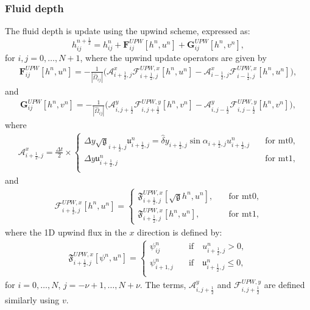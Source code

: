 \subsubsection{Fluid depth}
The fluid depth is update using the upwind scheme, expressed as:
\begin{equation}
	\label{2d-continuity-eq-Cgrid}
	h^{n+\frac{1}{2}}_{ij} =
	h^{n}_{ij} + \mathbf{F}_{ij}^{UPW}[{h^n,{u}^{n}}]  + \mathbf{G}_{ij}^{UPW}[{h^n,{v}^{n}}],
\end{equation}
for $i,j=0,\ldots,N+1$,
where the upwind update operators are given by
\begin{align}
	\mathbf{F}_{ij}^{UPW}[{h^n,u^{n}}] = 
	-\frac{1}{|\hat{\Omega}_{ij}|}
	\bigg(\mathcal{A}_{i+\frac{1}{2},j}^{x} \mathcal{F}_{i+\frac{1}{2},j}^{UPW,x}[h^n,{u}^{n}]-
	      \mathcal{A}_{i-\frac{1}{2},j}^{x} \mathcal{F}_{i-\frac{1}{2},j}^{UPW,x}[h^n,{u}^{n}] \bigg),
\end{align}
and
\begin{align}
	\mathbf{G}_{ij}^{UPW}[{h^n,v^{n}}] = 
	-\frac{1}{|\hat{\Omega}_{ij}|}
	\bigg(\mathcal{A}_{i,j+\frac{1}{2}}^{y} \mathcal{F}_{i,j+\frac{1}{2}}^{UPW,y}[h^n,{v}^{n}]-
          \mathcal{A}_{i,j-\frac{1}{2}}^{y} \mathcal{F}_{i,j-\frac{1}{2}}^{UPW,y}[h^n,{v}^{n}] \bigg),
\end{align}
where
\begin{align}
	\mathcal{A}_{i+\frac{1}{2},j}^{x} = \frac{\Delta t}{2} \times
	\begin{cases}
		\Delta y
		\sqrt{\mathfrak{g}}_{i+\frac{1}{2},j}
		\mathfrak{u}_{i+\frac{1}{2},j}^n=
		\hat{\delta} y_{i+\frac{1}{2},j}
		\sin{\alpha_{i+\frac{1}{2},j}}
		{u}_{i+\frac{1}{2},j}^n
		\quad &
		\text{for mt0},\\
		\Delta y
		\mathfrak{u}_{i+\frac{1}{2},j}^n
		\quad &
		\text{for mt1},\\
	\end{cases}
\end{align}
and
\begin{align}
	\mathcal{F}_{i+\frac{1}{2},j}^{UPW,x} [{h}^n,u^n]= 
	\begin{cases}
		\mathfrak{F}_{i+\frac{1}{2},j}^{UPW,x}[{{\sqrt{\mathfrak{g}}h}^n},u^n],
		\quad &\text{for mt0},\\
		\mathfrak{F}_{i+\frac{1}{2},j}^{UPW,x}[{h}^n,u^n],
		\quad &\text{for mt1},
	\end{cases}
\end{align}
where the 1D upwind flux in the $x$ direction is defined by:
\begin{align}
	\mathfrak{F}_{i+\frac{1}{2},j}^{UPW,x} [{{\psi}^n},u^n]=
	\begin{cases}
		{\psi}_{ij}^n
		\quad &\text{if} \quad 
		{u}_{i+\frac{1}{2},j}^{n}>0,\\
		{\psi}_{i+1,j}^n
		\quad &\text{if} \quad 
		\mathfrak{u}_{i+\frac{1}{2},j}^{n}\leq0,\\
	\end{cases}
\end{align}
for $i=0, \ldots, N$, $j=-\nu+1, \ldots, N + \nu$.
The terms, $\mathcal{A}_{i,j+\frac{1}{2}}^{y}$ and	$\mathcal{F}_{i,j+\frac{1}{2}}^{UPW,y}$ are defined similarly using $v$.

